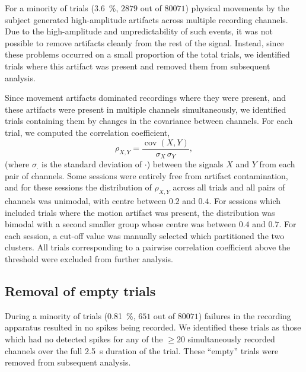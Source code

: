 For a minority of trials (\SI{3.6}{\percent}, $2879$ out of $80071$) physical movements by the subject generated high-amplitude artifacts across multiple recording channels.
Due to the high-amplitude and unpredictability of such events, it was not possible to remove artifacts cleanly from the rest of the signal.
Instead, since these problems occurred on a small proportion of the total trials, we identified trials where this artifact was present and removed them from subsequent analysis.

Since movement artifacts dominated recordings where they were present, and these artifacts were present in multiple channels simultaneously, we identified trials containing them by changes in the covariance between channels.
For each trial, we computed the correlation coefficient,
\begin{equation}
\rho_{X,Y} = \frac{\operatorname{cov}(X,Y)}{\sigma_X \, \sigma_Y}
,\end{equation}
(where $\sigma_\cdot$ is the standard deviation of $\cdot$) between the signals $X$ and $Y$ from each pair of channels.
Some sessions were entirely free from artifact contamination, and for these sessions the distribution of $\rho_{X,Y}$ across all trials and all pairs of channels was unimodal, with centre between $0.2$ and $0.4$.
For sessions which included trials where the motion artifact was present, the distribution was bimodal with a second smaller group whose centre was between $0.4$ and $0.7$.
For each session, a cut-off value was manually selected which partitioned the two clusters.
All trials corresponding to a pairwise correlation coefficient above the threshold were excluded from further analysis.



\subsection{Removal of empty trials}
\label{sec:pl_empty_trials}

During a minority of trials (\SI{0.81}{\percent}, $651$ out of $80071$) failures in the recording apparatus resulted in no spikes being recorded.
We identified these trials as those which had no detected spikes for any of the ${\ge}20$ simultaneously recorded channels over the full \SI{2.5}{\second} duration of the trial.
These ``empty'' trials were removed from subsequent analysis.


